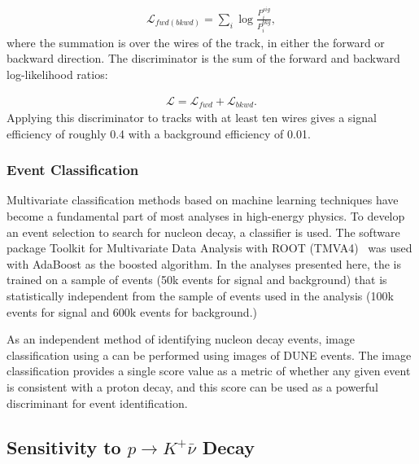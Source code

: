 \begin{align}
 \mathcal{L}_{fwd(bkwd)} = \sum_{i} \log\frac{P^{sig}_i}{P^{bkg}_i}, 
\end{align}
where the summation is over the wires of the track, in either the forward or backward direction. The discriminator is the sum of the forward and backward log-likelihood ratios:

\begin{align}
    \mathcal{L} = \mathcal{L}_{fwd} + \mathcal{L}_{bkwd}.\label{eqn:L}
\end{align}
Applying this discriminator to tracks with at least ten wires gives a signal efficiency of roughly 0.4 with a background efficiency of 0.01.

\subsubsection{Event Classification}

Multivariate classification methods based on machine learning techniques have become a fundamental part of most analyses in high-energy physics. 
To develop an event selection to search for nucleon decay, a 
classifier is used. The software package Toolkit for Multivariate Data Analysis with ROOT (TMVA4)~\cite{Hocker:2007ht}
was used with AdaBoost as the boosted algorithm.  In the analyses presented here, the  is trained on a sample of  events (50k events for signal and background) that is statistically independent from the sample of  events used in the analysis (100k events for signal and 600k events for background.)

As an independent method of identifying nucleon decay events, image classification using a 
can be performed using \twod images of DUNE  events. The image classification provides a single score value as a metric of whether any given event is consistent with a proton decay, and this score can be used as a powerful discriminant for event identification.

\subsection{Sensitivity to $p\to K^+\bar{\nu}$ Decay}
\label{subsec:nonaccel-ndk-nubarkplus}


